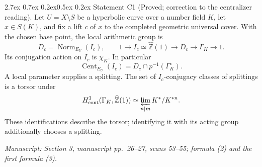 \documentclass[11pt,a4paper]{article}
\makeatletter
\newcommand{\Cent}{\operatorname{Cent}}
\newcommand{\Norm}{\operatorname{Norm}}
\newcommand{\Zhat}{\widehat{\mathbb Z}}
\newcommand{\passage}[1]{\par\smallskip\noindent\textit{Manuscript: #1}\par\smallskip}
\renewcommand\paragraph{\@startsection{paragraph}{4}{\z@}%
  {2.7ex \@plus 0.7ex \@minus 0.2ex}{0.5ex \@plus 0.2ex}%
  {\normalfont\normalsize\bfseries}}
\makeatother
\begin{document}
\paragraph{Statement C1 (Proved; correction to the centralizer reading).}\label{res:C1}
Let $U=X\setminus S$ be a hyperbolic curve over a number field $K$, let $x\in S(K)$, and fix a lift $c$ of $x$ to the completed geometric universal cover. With the chosen base point, the local arithmetic group is
\[
 D_c=\Norm_{E_U}(I_c),\qquad
 1\longrightarrow I_c\simeq\Zhat(1)\longrightarrow D_c
   \longrightarrow\Gamma_K\longrightarrow1.
\]
Its conjugation action on $I_c$ is $\chi_K$. In particular
\[
 \Cent_{E_U}(I_c)=D_c\cap p^{-1}(\Gamma_K^\circ).
\]
A local parameter supplies a splitting. The set of $I_c$-conjugacy classes of splittings is a torsor under
\[
 H^1_{\mathrm{cont}}(\Gamma_K,\Zhat(1))
   \simeq\varprojlim_{n\mid m} K^*/K^{*n}.
\]
These identifications describe the torsor; identifying it with its acting group additionally chooses a splitting.
\passage{Section 3, manuscript pp.~26--27, scans 53--55; formula (2) and the first formula (3).}
\end{document}
